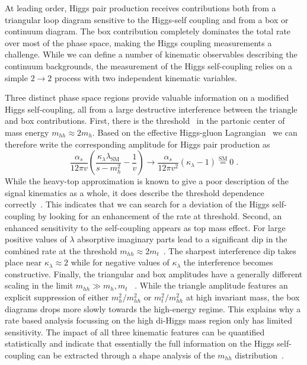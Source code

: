 At leading order, Higgs pair production receives contributions both 
from a triangular loop diagram sensitive to the Higgs-self coupling 
and from a box or continuum diagram. The box contribution completely 
dominates the total rate over most of the phase space, making the Higgs 
coupling measurements a challenge. While we can define a number of
kinematic observables describing the continuum backgrounds, the
measurement of the Higgs self-coupling relies on a simple $2 \to 2$
process with two independent kinematic variables.

Three distinct phase space regions provide valuable information on a
modified Higgs self-coupling, all from a large destructive interference 
between the triangle and box contributions. First, there is the 
threshold~\cite{Plehn:1996wb, Djouadi:1999rca, Li:2013rra, Baur:2002rb, Baur:2002qd,Li:2015yia} in the partonic center of mass energy 
$ m_{hh} \approx 2 m_h$. Based on the effective
Higgs-gluon Lagrangian~\cite{Shifman:1979eb,  Kniehl:1995tn, Spira:2016zna} we can therefore write the
corresponding amplitude for Higgs pair production as
%
\begin{equation}
\frac{\alpha_s}{12 \pi v}
\left( \frac{\kappa_\lambda \lambda_\text{SM}}{s-m_h^2} - \frac{1}{v} \right) 
\to
\frac{\alpha_s}{12 \pi v^2}
\left( \kappa_\lambda -1 \right) \stackrel{\text{SM}}{=} 0 \; .
\label{eq:higgs_pair}
\end{equation}
%
While the heavy-top approximation is known to give a poor description
of the signal kinematics as a whole, it does describe the threshold
dependence correctly~\cite{Baur:2002rb, Baur:2002qd,Li:2015yia}. 
This indicates that we can search
for a deviation of the Higgs self-coupling by looking for an
enhancement of the rate at threshold. 
Second, an enhanced sensitivity to the self-coupling appears as top
mass effect. For large positive values of $\lambda$ absorptive imaginary 
parts lead to a significant dip in the combined rate at the threshold 
$m_{hh} \approx 2 m_t $~\cite{Dolan:2012rv, Barr:2013tda, Kling:2016lay}. 
The sharpest interference dip takes place near $\kappa_\lambda\approx 2$
while for negative values of $\kappa_\lambda$ the interference 
becomes constructive.
Finally, the triangular and box amplitudes have a generally different
scaling in the limit $m_{hh} \gg m_h, m_t$
~\cite{Plehn:1996wb, Djouadi:1999rca, Li:2013rra,Dolan:2012rv, Barr:2013tda}. While the triangle amplitude features an 
explicit suppression of either $m_h^2/m_{hh}^2$ or 
$m_t^2/m_{hh}^2$ at high invariant mass, the box diagrams drops 
more slowly towards the high-energy regime. This explains why a 
rate based analysis focussing on the high di-Higgs mass region
only has limited sensitivity. The impact of all three kinematic features can be quantified
statistically and  indicate that essentially the full
information on the Higgs self-coupling can be extracted through a
shape analysis of the $m_{hh}$ distribution~\cite{Bauer:2017cov}. 


